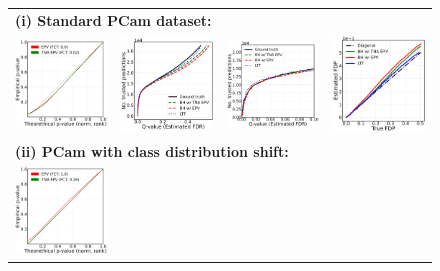 \documentclass{article}
\begin{document}
\begin{figure}[h!]
	
	\begin{tabular}{cccc}
		\multicolumn{4}{l}{\bf (i) Standard PCam dataset:}\\		
		\includegraphics[width=1.7in]{img/cnn_QQ_pcam.pdf} &
		\includegraphics[width=1.7in]{img/cnn_pcam_fdr_control.pdf} & 
		\includegraphics[width=1.7in]{img/cnn_pcam_fdr_control_loc.pdf} &
		\includegraphics[width=1.7in]{img/cnn_FDPscat_pcam.pdf}\\	
		\multicolumn{4}{l}{\bf (ii) PCam with class distribution shift:}\\		
		\includegraphics[width=1.7in]{img/cnn_QQ_pcam_balanced.png} &

\end{tabular}
\end{figure}
\end{document}
